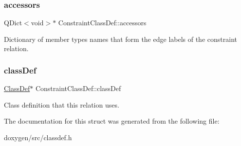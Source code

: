 \subsubsection{\texorpdfstring{accessors}{accessors}}
{\footnotesize\ttfamily Q\+Dict$<$void$>$$\ast$ Constraint\+Class\+Def\+::accessors}

Dictionary of member types names that form the edge labels of the constraint relation. \mbox{\label{struct_constraint_class_def_a19b68e8a482c234e891caf07a74608ef}} 
\subsubsection{\texorpdfstring{classDef}{classDef}}
{\footnotesize\ttfamily \mbox{\hyperlink{class_class_def}{Class\+Def}}$\ast$ Constraint\+Class\+Def\+::class\+Def}

Class definition that this relation uses. 

The documentation for this struct was generated from the following file\+:\begin{DoxyCompactItemize}
\item 
doxygen/src/classdef.\+h\end{DoxyCompactItemize}
